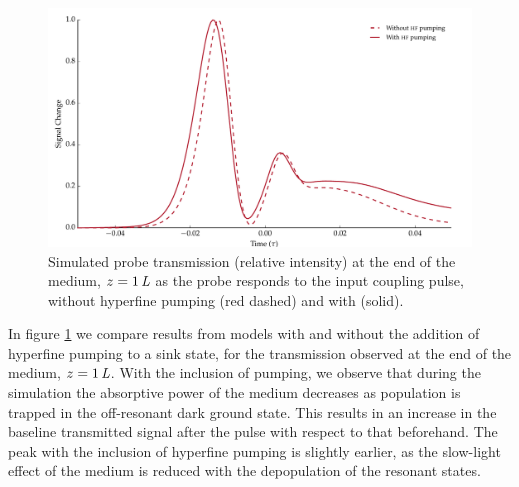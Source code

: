     \begin{figure}[]
      \includegraphics[width=\linewidth]{figs/06_simultons/mb_vee2g_exp_build_plot_1_2_fig1.pdf}
      \caption{
      Simulated probe transmission (relative intensity) at the end of the
      medium, $z=\unit[1]{\textit{L}}$ as the probe responds to the input
      coupling pulse, without hyperfine pumping (red dashed) and with (solid).
      }
      \label{fig:hf_pumping} 
    \end{figure}

    In figure \ref{fig:hf_pumping} we compare results from models with and
    without the addition of hyperfine pumping to a sink state, for the
    transmission observed at the end of the medium, $z=\unit[1]{\textit{L}}$.
    With the inclusion of pumping, we observe that during the simulation the
    absorptive power of the medium decreases as population is trapped in the
    off-resonant dark ground state. This results in an increase in the baseline
    transmitted signal after the pulse with respect to that beforehand. The peak
    with the inclusion of hyperfine pumping is slightly earlier, as the 
    slow-light effect of the medium is reduced with the depopulation of the
    resonant states.
